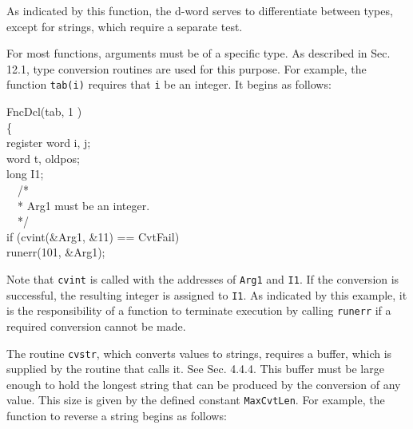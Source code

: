 \noindent
As indicated by this function, the d-word serves to differentiate
between types, except for strings, which require a separate test.

For most functions, arguments must be of a specific type. As described in
Sec. 12.1, type conversion routines are used for this purpose. For example,
the function \texttt{tab(i)} requires that \texttt{i} be an integer. It
begins as follows:

\goodbreak
\begin{iconcode}
\color{red}FncDcl(tab, 1 )\\
\{\\
\>register word i, j;\\
\>word t, oldpos;\\
\>long I1;\\
\>\ \ /*\\
\>\ \ * Arg1 must be an integer.\\
\>\ \ */\\
\>if (cvint(\&Arg1, \&11) == CvtFail)\\
\>runerr(101, \&Arg1);
\end{iconcode}

\noindent
Note that \texttt{cvint} is called with the addresses of \texttt{Arg1} and
\texttt{I1}. If the conversion is successful, the resulting integer is assigned
to \texttt{I1}. As indicated by this example, it is the responsibility of a
function to terminate execution by calling \texttt{runerr} if a required
conversion cannot be made.

The routine \texttt{cvstr}, which converts values to strings, requires a buffer,
which is supplied by the routine that calls it.  See Sec. 4.4.4. This buffer
must be large enough to hold the longest string that can be produced by the
conversion of any value. This size is given by the defined constant
\texttt{MaxCvtLen}. For example, the function to reverse a string begins as
follows:

